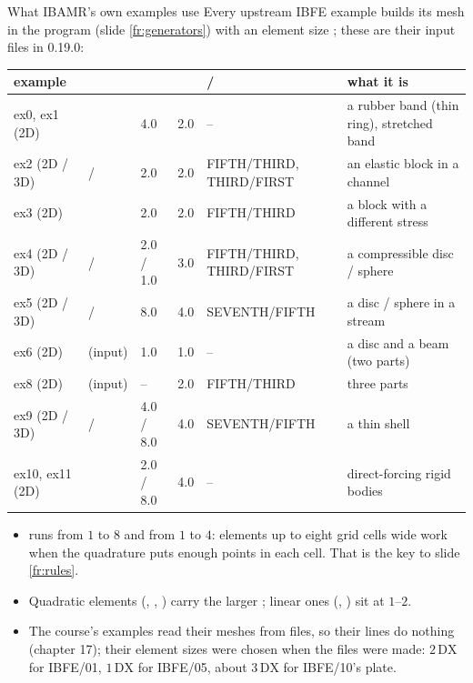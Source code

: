 \documentclass[aspectratio=169,11pt]{beamer}
\begin{document}
\begin{frame}{What IBAMR's own examples use}
\label{fr:upstream}
\scriptsize
Every upstream IBFE example builds its mesh in the program (slide \ref{fr:generators}) with an element size ; these are their input files in 0.19.0:

\setlength{\tabcolsep}{3pt}
\begin{tabular}{@{}L{0.13\textwidth}L{0.15\textwidth}L{0.07\textwidth}L{0.10\textwidth}L{0.19\textwidth}L{0.24\textwidth}@{}}
\toprule
example &  &  &   &  /  & what it is \\
\midrule
ex0, ex1 (2D) &  & 4.0 & 2.0 & -- & a rubber band (thin ring), stretched band \\
ex2 (2D / 3D) &  /  & 2.0 & 2.0 & FIFTH/THIRD, THIRD/FIRST & an elastic block in a channel \\
ex3 (2D) &  & 2.0 & 2.0 & FIFTH/THIRD & a block with a different stress \\
ex4 (2D / 3D) &  /  & 2.0 / 1.0 & 3.0 & FIFTH/THIRD, THIRD/FIRST & a compressible disc / sphere \\
ex5 (2D / 3D) &  /  & 8.0 & 4.0 & SEVENTH/FIFTH & a disc / sphere in a stream \\
ex6 (2D) & (input) & 1.0 & 1.0 & -- & a disc and a beam (two parts) \\
ex8 (2D) & (input) & -- & 2.0 & FIFTH/THIRD & three parts \\
ex9 (2D / 3D) &  /  & 4.0 / 8.0 & 4.0 & SEVENTH/FIFTH & a thin shell \\
ex10, ex11 (2D) &  & 2.0 / 8.0 & 4.0 & -- & direct-forcing rigid bodies \\
\bottomrule
\end{tabular}

\medskip
\begin{itemize}
  \item {} runs from $1$ to $8$ and  from $1$ to $4$: elements up to eight grid cells wide work when the quadrature puts enough points in each cell. That is the key to slide \ref{fr:rules}.
  \item Quadratic elements (, , ) carry the larger ; linear ones (, ) sit at $1$--$2$.
  \item The course's examples read their meshes from files, so their  lines do nothing (chapter 17); their element sizes were chosen when the files were made: $2\,\mathrm{DX}$ for IBFE/01, $1\,\mathrm{DX}$ for IBFE/05, about $3\,\mathrm{DX}$ for IBFE/10's plate.
\end{itemize}
\end{frame}
\end{document}
